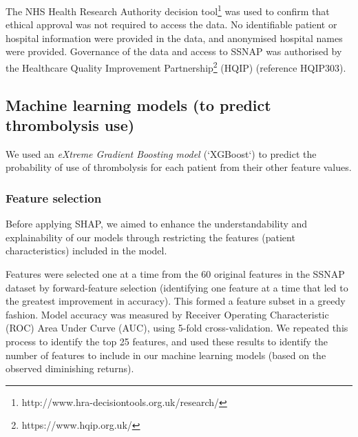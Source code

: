 The NHS Health Research Authority decision tool\footnote{http://www.hra-decisiontools.org.uk/research/} was used to confirm that ethical approval was not required to access the data. No identifiable patient or hospital information were provided in the data, and anonymised hospital names were provided. Governance of the data and access to SSNAP was authorised by the Healthcare Quality Improvement Partnership\footnote{https://www.hqip.org.uk/} (HQIP) (reference HQIP303). 

\subsection{Machine learning models (to predict thrombolysis use)}
We used an \emph{eXtreme Gradient Boosting model \cite{chen_xgboost_2016}} (`XGBoost`) to predict the probability of use of thrombolysis for each patient from their other feature values.

\subsubsection{Feature selection}
Before applying SHAP, we aimed to enhance the understandability and explainability of our models through restricting the features (patient characteristics) included in the model. 

Features were selected one at a time from the 60 original features in the SSNAP dataset by forward-feature selection \cite{ferri_comparative_1994} (identifying one feature at a time that led to the greatest improvement in accuracy). This formed a feature subset in a greedy fashion. Model accuracy was measured by Receiver Operating Characteristic (ROC) Area Under Curve (AUC), using 5-fold cross-validation. We repeated this process to identify the top 25 features, and used these results to identify the number of features to include in our machine learning models (based on the observed diminishing returns).


